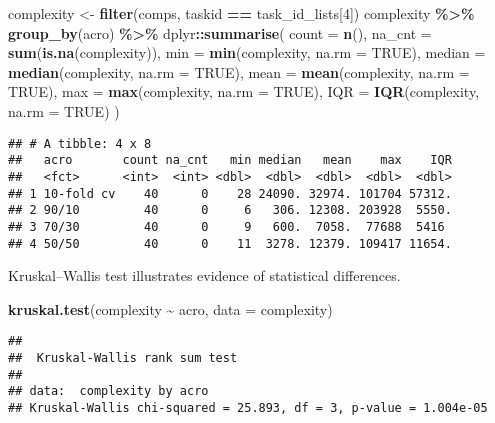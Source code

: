 \documentclass[
]{book}
\newenvironment{Shaded}{\begin{snugshade}}{\end{snugshade}}
\newcommand{\AttributeTok}[1]{\textcolor[rgb]{0.13,0.29,0.53}{#1}}
\newcommand{\ConstantTok}[1]{\textcolor[rgb]{0.56,0.35,0.01}{#1}}
\newcommand{\DecValTok}[1]{\textcolor[rgb]{0.00,0.00,0.81}{#1}}
\newcommand{\FunctionTok}[1]{\textcolor[rgb]{0.13,0.29,0.53}{\textbf{#1}}}
\newcommand{\NormalTok}[1]{#1}
\newcommand{\OtherTok}[1]{\textcolor[rgb]{0.56,0.35,0.01}{#1}}
\newcommand{\SpecialCharTok}[1]{\textcolor[rgb]{0.81,0.36,0.00}{\textbf{#1}}}
\begin{document}
\begin{Shaded}
\begin{Highlighting}[]
\NormalTok{complexity }\OtherTok{\textless{}{-}} \FunctionTok{filter}\NormalTok{(comps, taskid }\SpecialCharTok{==}\NormalTok{ task\_id\_lists[}\DecValTok{4}\NormalTok{])}
\NormalTok{complexity }\SpecialCharTok{\%\textgreater{}\%}
  \FunctionTok{group\_by}\NormalTok{(acro) }\SpecialCharTok{\%\textgreater{}\%}
\NormalTok{  dplyr}\SpecialCharTok{::}\FunctionTok{summarise}\NormalTok{(}
    \AttributeTok{count =} \FunctionTok{n}\NormalTok{(),}
    \AttributeTok{na\_cnt =} \FunctionTok{sum}\NormalTok{(}\FunctionTok{is.na}\NormalTok{(complexity)),}
    \AttributeTok{min =} \FunctionTok{min}\NormalTok{(complexity, }\AttributeTok{na.rm =} \ConstantTok{TRUE}\NormalTok{),}
    \AttributeTok{median =} \FunctionTok{median}\NormalTok{(complexity, }\AttributeTok{na.rm =} \ConstantTok{TRUE}\NormalTok{),}
    \AttributeTok{mean =} \FunctionTok{mean}\NormalTok{(complexity, }\AttributeTok{na.rm =} \ConstantTok{TRUE}\NormalTok{),}
    \AttributeTok{max =} \FunctionTok{max}\NormalTok{(complexity, }\AttributeTok{na.rm =} \ConstantTok{TRUE}\NormalTok{),}
    \AttributeTok{IQR =} \FunctionTok{IQR}\NormalTok{(complexity, }\AttributeTok{na.rm =} \ConstantTok{TRUE}\NormalTok{)}
\NormalTok{  )}
\end{Highlighting}
\end{Shaded}

\begin{verbatim}
## # A tibble: 4 x 8
##   acro       count na_cnt   min median   mean    max    IQR
##   <fct>      <int>  <int> <dbl>  <dbl>  <dbl>  <dbl>  <dbl>
## 1 10-fold cv    40      0    28 24090. 32974. 101704 57312.
## 2 90/10         40      0     6   306. 12308. 203928  5550.
## 3 70/30         40      0     9   600.  7058.  77688  5416 
## 4 50/50         40      0    11  3278. 12379. 109417 11654.
\end{verbatim}

Kruskal--Wallis test illustrates evidence of statistical differences.

\begin{Shaded}
\begin{Highlighting}[]
\FunctionTok{kruskal.test}\NormalTok{(complexity }\SpecialCharTok{\textasciitilde{}}\NormalTok{ acro, }\AttributeTok{data =}\NormalTok{ complexity)}
\end{Highlighting}
\end{Shaded}

\begin{verbatim}
## 
##  Kruskal-Wallis rank sum test
## 
## data:  complexity by acro
## Kruskal-Wallis chi-squared = 25.893, df = 3, p-value = 1.004e-05
\end{verbatim}
\end{document}
